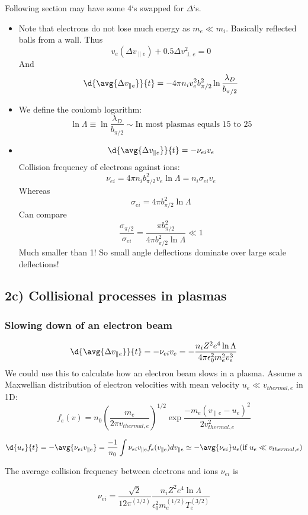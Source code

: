 \documentclass[PlasmaNotes.tex]{subfiles}
\begin{document}
Following section may have some 4`s swapped for $\Delta$`s. 
\begin{itemize}
\item Note that electrons do not lose much energy as $m_e \ll m_i$. Basically reflected balls from a wall. Thus
\[ v_e (\Delta v_{\parallel e}) + 0.5 \Delta v_{\perp e}^2 = 0\]
And
\[\d{\avg{\Delta v_{\parallel e}}}{t} = - 4 \pi n_i v_e^2 b_{\pi/2}^2 \ln{\frac{\lambda_D}{b_{\pi/2}}} \]
\item We define the coulomb logarithm: 
\[ \ln{\Lambda} \equiv \ln{\frac{\lambda_D}{b_{\pi/2}}} \sim \text{In most plasmas equals  15 to 25} \]
\item 
\[ \d{\avg{\Delta v_{\parallel e} }}{t} = - \nu_{ei} v_e \]
Collision frequency of electrons against ions:
\[ \nu_{ei} = 4 \pi n_i b_{\pi/2}^2 v_e \ln{\Lambda} = n_i \sigma_{ei} v_e \]
Whereas
\[ \sigma_{ei} = 4 \pi b_{\pi/2}^2 \ln{\Lambda} \]
Can compare 
\[ \frac{\sigma_{\pi/2}}{\sigma_{ei}} = \frac{\pi b_{\pi/2}^2}{4 \pi b_{\pi/2}^2 \ln{\Lambda}} \ll 1\]
Much smaller than 1! So small angle deflections dominate over large scale deflections!
\end{itemize}

\subsection{2c) Collisional processes in plasmas}
\subsubsection{Slowing down of an electron beam}
\[ \d{\avg{\Delta v_{\parallel e} }}{t} = - \nu_{ei} v_e = -\frac{n_i Z^2 e^4 \ln{\Lambda}}{4 \pi \epsilon_0^2 m_e^2 v_e^3} \]
We could use this to calculate how an electron beam slows in a plasma.
Assume a Maxwellian distribution of electron velocities with mean velocity $u_e\ll v_{thermal, e}$ in 1D:
\[ f_e(v) = n_0 (\frac{m_e}{2 \pi v_{thermal,e}})^{1/2} \exp{\frac{-m_e (v_{\parallel e} - u_e)^2}{2 v_{thermal,e}^2}} \]

\[ \d{u_e}{t} = -\avg{\nu_{ei} v_{\parallel e}} = \frac{-1}{n_0} \int{\nu_{ei} v_{\parallel e} f_e(v_{\parallel e}) dv_{\parallel e}} \simeq -\avg{\nu_{ei}} u_e (\text{if } u_e \ll v_{thermal, e})\]  

The average collision frequency between electrons and ions $\nu_{ei}$ is

\[ \nu_{ei} = \frac{\sqrt{2}}{12 \pi^(3/2)} \frac{n_i Z^2 e^4 \ln{\Lambda}}{\epsilon_0^2 m_e^(1/2) T_e^(3/2)} \]
\end{document}
